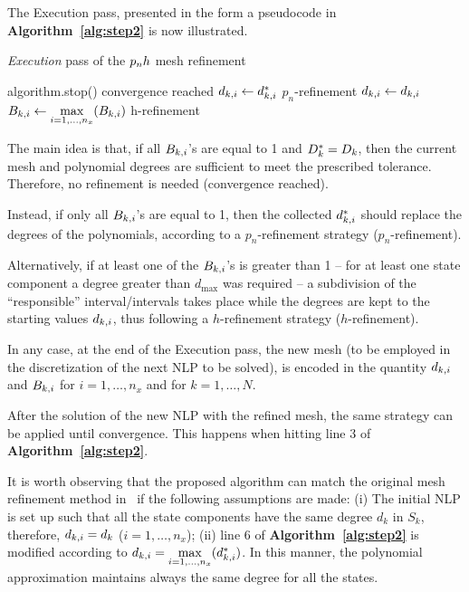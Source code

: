 The Execution pass, presented in the form a pseudocode in {\bf Algorithm~\ref{alg:step2}} is now illustrated.
\begin{algorithm}
	\caption{\emph{Execution} pass of the $p_{n}h$ mesh refinement}\label{alg:step2}
	\begin{algorithmic}[1]
			\If {$\Dks = \Dk$}
				\State algorithm.stop() \Comment convergence reached	
			\Else
					\State $d_{k,i} \gets d_{k,i}^{*}$ \Comment ${p_n}$-refinement
				\EndFor
			\EndIf
		\Else
				\State $d_{k,i} \gets d_{k,i}$
				\State $B_{k,i} \gets \max\limits_{i= 1, \dots, n_x}(B_{k,i})$ \Comment h-refinement
			\EndFor		
		\EndIf
	\end{algorithmic}
\end{algorithm}
The main idea is that, if all $B_{k,i}$'s are equal to 1 and $\Dks = \Dk$, then the current mesh and polynomial degrees are sufficient to meet the prescribed tolerance. Therefore, no refinement is needed (convergence reached).

 Instead, if only all $B_{k,i}$'s are equal to 1, then the collected $d_{k,i}^{*}$ should replace the degrees of the polynomials, according to a $p_n$-refinement strategy (${p_n}$-refinement).

Alternatively, if at least one of the $B_{k,i}$'s is greater than 1 -- for at least one state component a degree greater than $d_{\max}$ was required -- a subdivision of the ``responsible'' interval/intervals takes place while the degrees are kept to the starting values $d_{k,i}$, thus following a $h$-refinement strategy ($h$-refinement).

In any case, at the end of the Execution pass, the new mesh (to be employed in the discretization of the next NLP to be solved), is encoded in the quantity $d_{k,i}$ and $B_{k,i}$ for $i = 1, \dots, n_x$ and for $k = 1, \dots, N$.

After the solution of the new NLP with the refined mesh, the same strategy can be applied until convergence. This happens when hitting line 3 of {\bf Algorithm~\ref{alg:step2}}.


It is worth observing that the proposed algorithm can match the original mesh refinement method in~\cite{Patterson:OCAM:2015} if the following assumptions are made: (i) The initial NLP is set up such that all the state components have the same degree $d_k$ in $S_k$, therefore, $d_{k,i} = d_k$ ($i = 1, \dots, n_x$); (ii) line 6 of {\bf Algorithm~\ref{alg:step2}} is modified according to $d_{k,i} = \max\limits_{i= 1, \dots, n_x}(d_{k,i}^{*})$. In this manner, the polynomial approximation maintains always the same degree for all the states.



